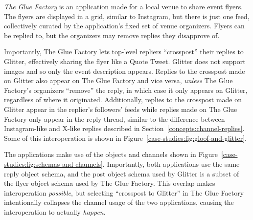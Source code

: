 \emph{The Glue Factory} is an application made for a local
venue to share event flyers.
The flyers are displayed in a grid, similar to Instagram,
but there is just one feed, collectively curated by
the application's fixed set of venue organizers.
Flyers can be replied to, but the organizers may remove replies they disapprove of.

Importantly, The Glue Factory lets
top-level repliers ``crosspost'' their replies
to Glitter, effectively sharing the flyer like a Quote Tweet.
Glitter does not support images and so only the
event description appears.
Replies to the crosspost made on Glitter also appear on The Glue Factory
and vice versa, \emph{unless} The Glue Factory's organizers ``remove'' the reply,
in which case it only appears on Glitter, regardless of where it originated.
Additionally, replies to the crosspost made on Glitter appear in the replier's followers'
feeds while replies made on The Glue Factory only appear in the reply thread,
similar to the difference between Instagram-like and X-like replies described in Section~\ref{concepts:channel-replies}.
Some of this interoperation is shown in Figure~\ref{case-studies:fig:gloof-and-glitter}.

The applications make use of the objects and channels
shown in Figure~\ref{case-studies:fig:schemas-and-channels}.
Importantly, both applications use the same reply object schema,
and the post object schema used by Glitter is a subset of the flyer
object schema used by The Glue Factory.
This overlap makes interoperation \emph{possible},
but selecting ``crosspost to Glitter'' in The Glue Factory intentionally collapses the
channel usage of the two applications,
causing the interoperation to actually \emph{happen}.


